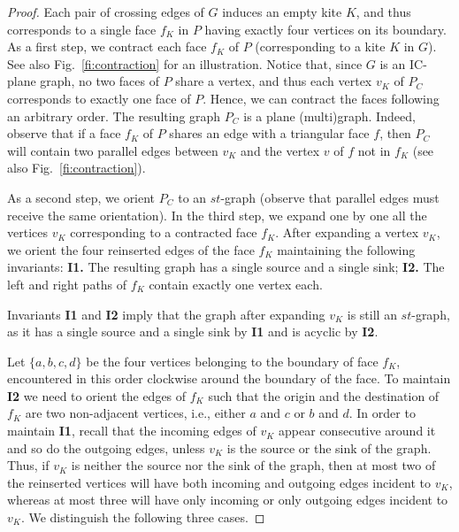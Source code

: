 \documentclass[a4paper]{article}
\begin{document}
\begin{proof}
Each pair of crossing edges of $G$ induces an empty kite $K$, and thus corresponds to a single face $f_K$ in $P$ having exactly four vertices on its boundary. As a first step, we contract each face $f_K$ of $P$ (corresponding to a kite $K$ in $G$). See also Fig.~\ref{fi:contraction} for an illustration. Notice that, since $G$ is an IC-plane graph, no two faces of $P$ share a vertex, and thus each vertex $v_K$ of $P_C$ corresponds to exactly one face of $P$. Hence, we can contract the faces following an arbitrary order. The resulting graph $P_C$ is a plane (multi)graph. Indeed, observe that if a face $f_K$ of $P$ shares an edge with a triangular face $f$, then $P_C$ will contain two parallel edges between $v_K$ and the vertex $v$ of $f$ not in $f_K$ (see also Fig.~\ref{fi:contraction}). 

As a second step, we orient $P_C$ to an $st$-graph (observe that parallel edges must receive the same orientation). In the third step, we expand one by one all the vertices $v_K$ corresponding to a contracted face $f_K$. After expanding a vertex $v_K$, we orient the four reinserted edges of the face $f_K$  maintaining the following invariants: {\bf I1.} The resulting graph has a single source and a single sink; {\bf I2.} The left and right paths of $f_K$ contain exactly one vertex each.


Invariants {\bf I1} and {\bf I2} imply that the graph after expanding $v_K$ is still an $st$-graph, as it has a single source and a single sink by {\bf I1} and is acyclic by {\bf I2}. 

Let $\{a,b,c,d\}$ be the four vertices belonging to the boundary of face $f_K$, encountered in this order clockwise around the boundary of the face. To maintain {\bf I2} we need to orient the edges of $f_K$ such that the origin and the destination of $f_K$ are two non-adjacent vertices, i.e., either $a$ and $c$ or $b$ and $d$. In order to maintain {\bf I1}, recall that the incoming edges of $v_K$ appear consecutive around it and so do the outgoing edges, unless $v_K$ is the source or the sink of the graph. Thus, if $v_K$ is neither the source nor the sink of the graph, then at most two of the reinserted vertices will have both incoming and outgoing edges incident to $v_K$, whereas at most three will have only incoming or only outgoing  edges incident to $v_K$. We distinguish the following three cases.

\medskip


\end{proof}
\end{document}

